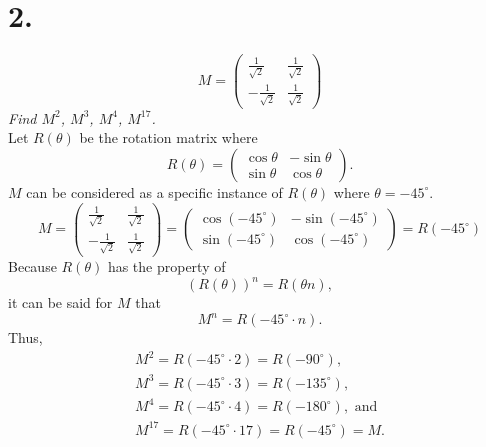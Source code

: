\documentclass[12pt]{article}
\begin{document}
\section*{2.}
\begin{equation*}
	M =
	\begin{pmatrix}
		\frac{1}{\sqrt{2}} & \frac{1}{\sqrt{2}} \\
		-\frac{1}{\sqrt{2}} & \frac{1}{\sqrt{2}}
	\end{pmatrix}
\end{equation*}
\textit{Find $M^2$, $M^3$, $M^4$, $M^{17}$.} \\[\baselineskip]
Let $R(\theta)$ be the rotation matrix where
\begin{equation*}
	R(\theta) =
	\begin{pmatrix}
		\cos \theta & -\sin \theta \\
		\sin \theta & \cos \theta
	\end{pmatrix}
	.
\end{equation*}
$M$ can be considered as a specific instance of $R(\theta)$ where
$\theta = -45^\circ$.
\begin{equation*}
	M =
	\begin{pmatrix}
		\frac{1}{\sqrt{2}} & \frac{1}{\sqrt{2}} \\
		-\frac{1}{\sqrt{2}} & \frac{1}{\sqrt{2}}
	\end{pmatrix}
	=
	\begin{pmatrix}
		\cos(-45^\circ) & -\sin(-45^\circ) \\
		\sin(-45^\circ) & \cos(-45^\circ)
	\end{pmatrix}
	=
	R(-45^\circ)
\end{equation*}
Because $R(\theta)$ has the property of
\begin{equation*}
	(R(\theta))^n = R(\theta n),
\end{equation*}
it can be said for $M$ that
\begin{equation*}
	M^n = R(-45^\circ \cdot n).
\end{equation*}
Thus,
\begin{gather*}
	\boxed{M^2 = R(-45^\circ \cdot 2) = R(-90^\circ)}, \\
	\boxed{M^3 = R(-45^\circ \cdot 3) = R(-135^\circ)}, \\
	\boxed{M^4 = R(-45^\circ \cdot 4) = R(-180^\circ)},\text{ and} \\
	\boxed{M^{17} = R(-45^\circ \cdot 17) = R(-45^\circ) = M} .
\end{gather*}
\end{document}
